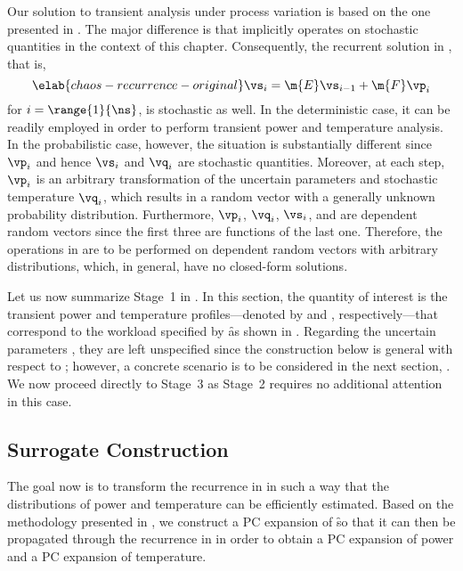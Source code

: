 Our solution to transient analysis under process variation is based on the one
presented in . The major difference is that
 implicitly operates on stochastic quantities in the
context of this chapter. Consequently, the recurrent solution in
, that is,
\begin{equation} \elab{chaos-recurrence-original}
  \vs_i = \m{E} \vs_{i - 1} + \m{F} \vp_i
\end{equation}
for $i = \range{1}{\ns}$, is stochastic as well. In the deterministic case, it
can be readily employed in order to perform transient power and temperature
analysis. In the probabilistic case, however, the situation is substantially
different since $\vp_i$ and hence $\vs_i$ and $\vq_i$ are stochastic quantities.
Moreover, at each step, $\vp_i$ is an arbitrary transformation of the uncertain
parameters \vu and stochastic temperature $\vq_i$, which results in a random
vector with a generally unknown probability distribution. Furthermore, $\vp_i$,
$\vq_i$, $\vs_i$, and \vu are dependent random vectors since the first three are
functions of the last one. Therefore, the operations in
 are to be performed on dependent random vectors
with arbitrary distributions, which, in general, have no closed-form solutions.

Let us now summarize Stage~1 in . In this section, the
quantity of interest \g is the transient power and temperature
profiles---denoted by \mp and \mq, respectively---that correspond to the
workload specified by \f as shown in . Regarding the
uncertain parameters \vu, they are left unspecified since the construction below
is general with respect to \vu; however, a concrete scenario is to be considered
in the next section, . We now proceed directly
to Stage~3 as Stage~2 requires no additional attention in this case.

\subsection{Surrogate Construction}

The goal now is to transform the recurrence in 
in such a way that the distributions of power and temperature can be efficiently
estimated. Based on the methodology presented in
, we construct a \ac{PC} expansion of \f so
that it can then be propagated through the recurrence in
 in order to obtain a \ac{PC} expansion of power
and a \ac{PC} expansion of temperature.

